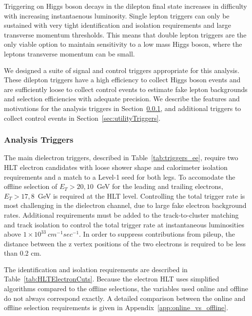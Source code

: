 Triggering on Higgs boson decays in the dilepton final state increases 
in difficulty with increasing instantaenous luminosity.
Single lepton triggers can only be sustained with very tight identification and
isolation requirements and large transverse momentum thresholds.
This means that double lepton triggers are the only viable option to maintain
sensitivity to a low mass Higgs boson, where the leptons transverse momentum
can be small.

We designed a suite of signal and control triggers appropriate for this analysis.
These dilepton triggers have a high efficiency to collect Higgs boson events
and are sufficiently loose to collect control events to estimate
fake lepton backgrounds and selection efficiencies with adequate precision.
We describe the features and motivations for the analysis triggers in Section~\ref{sec:mainTriggers},
and additional triggers to collect control events in 
Section~\ref{sec:utilityTriggers}.

\subsubsection{Analysis Triggers}
\label{sec:mainTriggers}

The main dielectron triggers, described in Table~\ref{tab:triggers_ee}, 
require two HLT electron candidates with loose shower shape and calorimeter isolation requirements 
and a match to a Level-1 seed for both legs. 
To accomodate the offline selection of $E_{T}>20,10$~GeV for the leading and trailing
electrons, $E_{T}>17,8$~GeV is required at the HLT level.
Controlling the total trigger rate is most challenging in
the dielectron channel, due to large fake electron background rates.
Additional requirements must be added to the track-to-cluster matching
and track isolation to control the total trigger rate at 
instantaneous luminosities above $1\times10^{33}~cm^{-1}sec^{-1}$.
In order to suppress contributions from pileup, the distance between the z vertex positions 
of the two electrons is required to be less than 0.2 cm.

The identification and isolation requirements are described in Table~\ref{tab:HLTElectronCuts}.
Because the electron HLT uses simplified algorithms compared to the offline selections,
the variables used online and offline do not always correspond exactly.
A detailed comparison between the online and offline selection requirements is given in
Appendix~\ref{app:online_vs_offline}.

